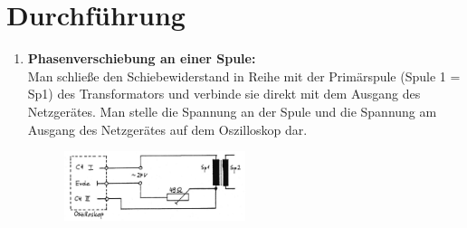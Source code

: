 \section{Durchführung} 

\begin{enumerate}
	\item \label{VT1}
		\textbf{Phasenverschiebung an einer Spule:}\\
		Man schließe den Schiebewiderstand in Reihe mit der Primärspule (Spule 1 = Sp1) des Transformators und verbinde sie direkt mit dem Ausgang des Netzgerätes. Man stelle die Spannung an der Spule und die Spannung am Ausgang des 
		Netzgerätes auf dem Oszilloskop dar.\\
		
		\begin{figure}[h]
			\centering
				\includegraphics[width=0.50\textwidth]{Versuch_15-16/Abbildungen/Bild31.jpg}
			\label{fig:Bild31}
		\end{figure}
		

\end{enumerate}
